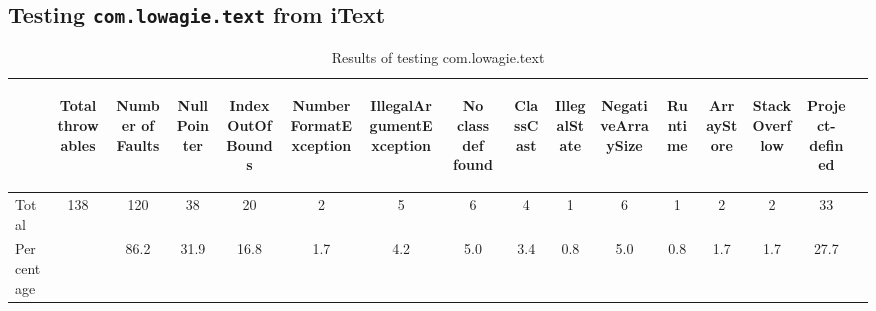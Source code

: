 \subsection{Testing \texttt{com.lowagie.text} from iText}
\begin{table*}[ht!]
\caption{Results of testing com.lowagie.text}\label{tab:comlowagietext}
\begin{minipage}{\textwidth}
{\small
\begin{center}
\begin{tabular}{l c c c c c c c c c c c c c c c}
\hline
&\begin{sideways}Total throwables\end{sideways}&\begin{sideways}Number of Faults\end{sideways}&\begin{sideways}NullPointer\end{sideways}&\begin{sideways}IndexOutOfBounds\end{sideways}&\begin{sideways}NumberFormatException\end{sideways}&\begin{sideways}IllegalArgumentException\end{sideways}&\begin{sideways}No class def found\end{sideways}&\begin{sideways}ClassCast\end{sideways}&\begin{sideways}IllegalState\end{sideways}&\begin{sideways}NegativeArraySize\end{sideways}&\begin{sideways}Runtime\end{sideways}&\begin{sideways}ArrayStore\end{sideways}&\begin{sideways}StackOverflow\end{sideways}&\begin{sideways}Project-defined\end{sideways}\\
\hline
Total&138&120&38&20&2&5&6&4&1&6&1&2&2&33\\
\hline
Percentage&&86.2&31.9&16.8&1.7&4.2&5.0&3.4&0.8&5.0&0.8&1.7&1.7&27.7\\
\hline
\end{tabular}
\end{center}
}
\end{minipage}
\end{table*}

